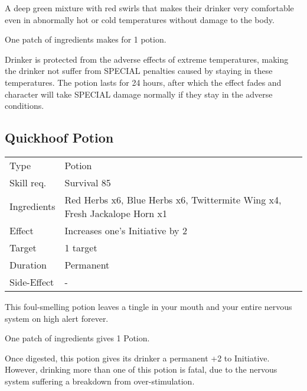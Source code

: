 \documentclass[11pt,a4paper,twocolumn]{book}
\begin{document}
\medskip

A deep green mixture with red swirls that makes their drinker very comfortable even in abnormally hot or cold temperatures without damage to the body.

One patch of ingredients makes for 1 potion.

Drinker is protected from the adverse effects of extreme temperatures, making the drinker not suffer from SPECIAL penalties caused by staying in these temperatures. The potion lasts for 24 hours, after which the effect fades and character will take SPECIAL damage normally if they stay in the adverse conditions.


\subsection*{Quickhoof Potion}
{
	\begin{tabu} to 75mm{| X[l,4] | X[l,8] |}
		\hline
		Type 			& Potion 																				\\
		Skill req.	    & Survival 85 																			\\
		Ingredients     & Red Herbs x6, Blue Herbs x6, Twittermite Wing x4, Fresh Jackalope Horn x1				\\
		Effect     		& Increases one's Initiative by 2 														\\
		Target      	& 1 target																				\\
		Duration  		& Permanent	 																			\\
		Side-Effect     & -																						\\ \hline
	\end{tabu}
	
}

\medskip

This foul-smelling potion leaves a tingle in your mouth and your entire nervous system on high alert forever.

One patch of ingredients gives 1 Potion.

Once digested, this potion gives its drinker a permanent +2 to Initiative. However, drinking more than one of this potion is fatal, due to the nervous system suffering a breakdown from over-stimulation.
\end{document}
